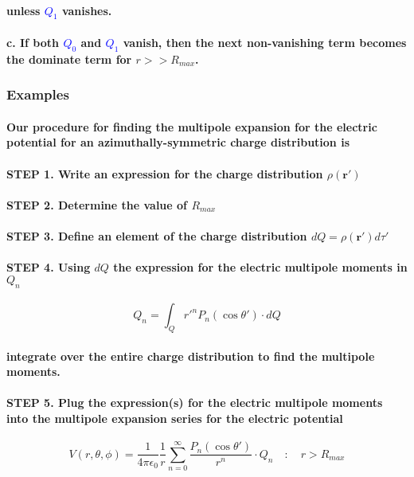 \documentclass{article}
\begin{document}
\paragraph{unless \textcolor{blue}{$Q_1$} vanishes.}
\paragraph{\indent c. If both \textcolor{blue}{$Q_0$} and \textcolor{blue}{$Q_1$} vanish, then the next non-vanishing term becomes the dominate term for $r>>R_{max}$.}
\subsubsection{Examples}
\paragraph{Our procedure for finding the multipole expansion for the electric potential for an azimuthally-symmetric charge distribution is}
\paragraph{STEP 1. Write an expression for the charge distribution $\rho(\boldsymbol{r'})$}
\paragraph{STEP 2. Determine the value of $R_{max}$}
\paragraph{STEP 3. Define an element of the charge distribution $dQ=\rho(\boldsymbol{r'})d\tau'$}
\paragraph{STEP 4. Using $dQ$ the expression for the electric multipole moments in $Q_n$}
\begin{equation*}
    Q_n=\int_Q r'^nP_n(\cos\theta')\cdot dQ
\end{equation*}
\paragraph{integrate over the entire charge distribution to find the multipole moments.}
\paragraph{STEP 5. Plug the expression(s) for the electric multipole moments into the multipole expansion series for the electric potential}
\begin{equation*}
    V(r, \theta, \phi)=\frac{1}{4\pi \epsilon_0}\frac{1}{r}\sum_{n=0}^{\infty}\frac{P_n(\cos \theta')}{r^n}\cdot Q_n \quad :\quad r>R_{max}
\end{equation*}
\end{document}
